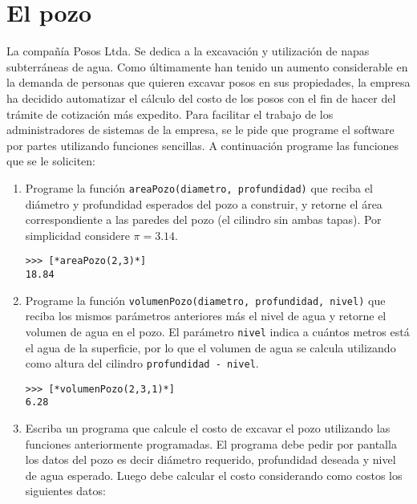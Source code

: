\section{El pozo}

  La compañía Posos Ltda.
  Se dedica a la excavación y utilización de napas subterráneas de agua.
  Como últimamente han tenido un aumento considerable
  en la demanda de personas que quieren excavar posos en sus propiedades,
  la empresa ha decidido automatizar el cálculo del costo
  de los posos con el fin de hacer del trámite de cotización
  más expedito.
  Para facilitar el trabajo de los administradores de sistemas
  de la empresa,
  se le pide que programe el software por partes
  utilizando funciones sencillas.
  A continuación programe las funciones que se le soliciten:
  
  \begin{enumerate}
  \item
    Programe la función \texttt{areaPozo(diametro, profundidad)}
    que reciba el diámetro y profundidad esperados del pozo a construir,
    y retorne el área correspondiente a las paredes del pozo
    (el cilindro sin ambas tapas).
    Por simplicidad considere \( \pi = 3.14\).
    
    \begin{lstlisting}[style=consola]
>>> [*areaPozo(2,3)*]
18.84
    \end{lstlisting}
  \item
    Programe la función \texttt{volumenPozo(diametro, profundidad, nivel)}
    que reciba los mismos parámetros anteriores más el nivel de agua y retorne
    el volumen de agua en el pozo.
    El parámetro \texttt{nivel} indica a cuántos metros está el agua de la superficie,
    por lo que el volumen de agua se calcula utilizando como altura del cilindro
    \texttt{profundidad - nivel}.
    
    \begin{lstlisting}[style=consola]
>>> [*volumenPozo(2,3,1)*]
6.28
    \end{lstlisting}
  \item
    Escriba un programa que calcule el costo de excavar el pozo utilizando las funciones
    anteriormente programadas.
    El programa debe pedir por pantalla los datos del pozo
    es decir diámetro requerido, profundidad deseada y nivel de agua esperado.
    Luego debe calcular el costo considerando como costos los siguientes datos:
    
    \vspace*{\baselineskip}
    

\end{enumerate}
